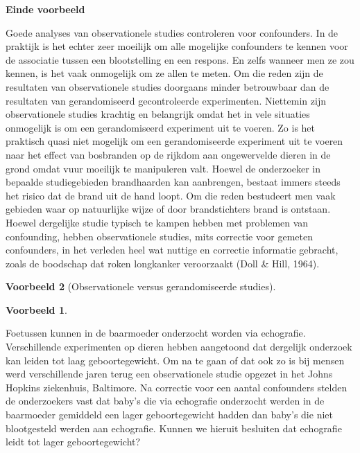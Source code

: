 \documentclass[
  12pt,dutch,coursenotes]{book}
\theoremstyle{definition}
\theoremstyle{definition}
\newtheorem{example}{Voorbeeld}[chapter]
\theoremstyle{definition}
\theoremstyle{remark}
\begin{document}
\textbf{Einde voorbeeld}

Goede analyses van observationele studies controleren voor confounders. In
de praktijk is het echter zeer moeilijk om alle mogelijke confounders te
kennen voor de associatie tussen een blootstelling en een respons. En zelfs
wanneer men ze zou kennen, is het vaak onmogelijk om ze allen te meten. Om
die reden zijn de resultaten van observationele studies doorgaans minder
betrouwbaar dan de resultaten van gerandomiseerd gecontroleerde
experimenten. Niettemin zijn observationele studies krachtig en belangrijk
omdat het in vele situaties onmogelijk is om een gerandomiseerd experiment
uit te voeren. Zo is het praktisch quasi niet mogelijk om een
gerandomiseerde experiment uit te voeren naar het effect van bosbranden op de rijkdom aan ongewervelde dieren in de grond omdat vuur moeilijk te manipuleren valt. Hoewel de onderzoeker in bepaalde studiegebieden brandhaarden kan aanbrengen, bestaat immers steeds het risico dat de brand uit de hand loopt. Om die reden bestudeert men vaak gebieden waar op natuurlijke wijze of door brandstichters brand is ontstaan. Hoewel dergelijke studie typisch te kampen hebben met problemen van confounding, hebben observationele studies, mits correctie
voor gemeten confounders, in het verleden heel wat nuttige en correctie informatie gebracht, zoals de boodschap dat roken longkanker veroorzaakt (Doll \& Hill, 1964).

\begin{example}[Observationele versus gerandomiseerde studies]
\begin{example}

\protect\hypertarget{exm:unnamed-chunk-84}{}{\label{exm:unnamed-chunk-84} \iffalse (Observationele versus gerandomiseerde studies) \fi{} }

\end{example}
\end{example}

Foetussen kunnen in de baarmoeder onderzocht worden via
echografie. Verschillende experimenten op dieren hebben aangetoond dat
dergelijk onderzoek kan leiden tot laag geboortegewicht. Om na te gaan of
dat ook zo is bij mensen werd verschillende jaren terug een observationele
studie opgezet in het Johns Hopkins ziekenhuis, Baltimore. Na correctie voor
een aantal confounders stelden de onderzoekers vast dat baby's die via
echografie onderzocht werden in de baarmoeder gemiddeld een lager
geboortegewicht hadden dan baby's die niet blootgesteld werden aan
echografie. Kunnen we hieruit besluiten dat echografie leidt tot lager
geboortegewicht?
\end{document}
